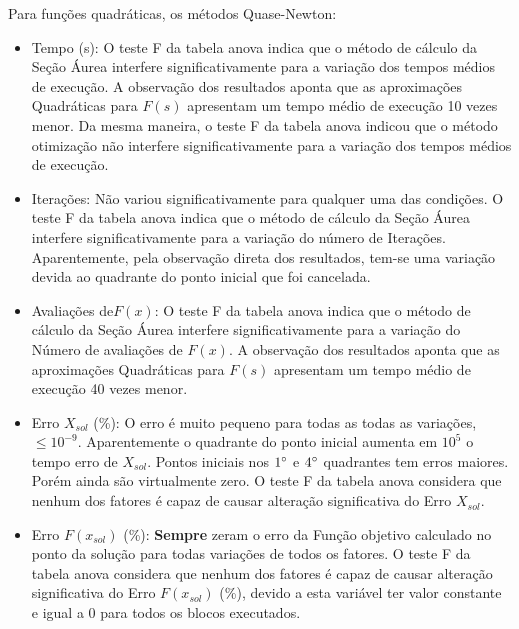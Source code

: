     Para funções quadráticas, os métodos Quase-Newton:
    \begin{itemize}
        \item {Tempo (s):} O teste F da tabela anova indica que o método de cálculo da Seção Áurea interfere significativamente para a variação dos tempos médios de execução. A observação dos resultados aponta que as aproximações Quadráticas para $F(s)$ apresentam um tempo médio de execução 10 vezes menor. Da mesma maneira, o teste F da tabela anova indicou que o método otimização não interfere significativamente para a variação dos tempos médios de execução. 
        \item {Iterações:} Não variou significativamente para qualquer uma das condições. O teste F da tabela anova indica que o método de cálculo da Seção Áurea interfere significativamente para a variação do número de Iterações. Aparentemente, pela observação direta dos resultados, tem-se uma variação devida ao quadrante do ponto inicial que foi cancelada.
        \item {Avaliações de$F(x)$:} O teste F da tabela anova indica que o método de cálculo da Seção Áurea interfere significativamente para a variação do Número de avaliações de $F(x)$. A observação dos resultados aponta que as aproximações Quadráticas para $F(s)$ apresentam um tempo médio de execução 40 vezes menor.
        \item {Erro $X_{sol}$ (\%):} O erro é muito pequeno para todas as todas as variações, $\leq 10^{-9}$. Aparentemente o quadrante do ponto inicial aumenta em $10^5$ o tempo erro de $X_{sol}$. Pontos iniciais nos $1\degree$ e $4\degree$ quadrantes tem erros maiores. Porém ainda são virtualmente zero. O teste F da tabela anova considera que nenhum dos fatores é capaz de causar alteração significativa do Erro $X_{sol}$.
        \item {Erro $F(x_{sol})$ (\%):} \textbf{Sempre} zeram o erro da Função objetivo calculado no ponto da solução para todas variações de todos os fatores. O teste F da tabela anova considera que nenhum dos fatores é capaz de causar alteração significativa do Erro $F(x_{sol})$ (\%), devido a esta variável ter valor constante e igual a 0 para todos os blocos executados.
    \end{itemize}
       